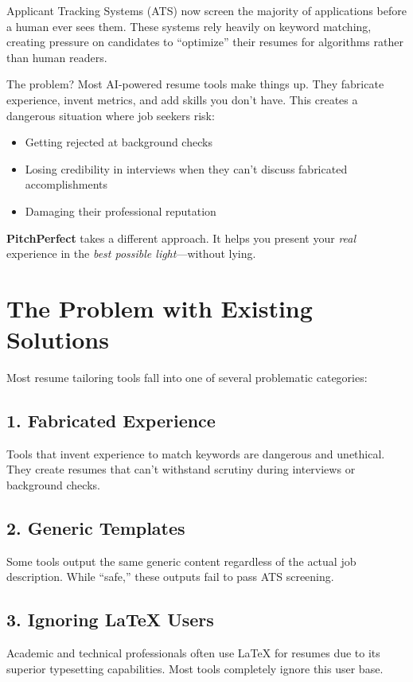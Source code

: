 \documentclass[12pt, a4paper]{article}
\begin{document}
Applicant Tracking Systems (ATS) now screen the majority of applications before a human ever sees them. These systems rely heavily on keyword matching, creating pressure on candidates to ``optimize'' their resumes for algorithms rather than human readers.

The problem? Most AI-powered resume tools make things up. They fabricate experience, invent metrics, and add skills you don't have. This creates a dangerous situation where job seekers risk:
\begin{itemize}
    \item Getting rejected at background checks
    \item Losing credibility in interviews when they can't discuss fabricated accomplishments
    \item Damaging their professional reputation
\end{itemize}

\textbf{PitchPerfect} takes a different approach. It helps you present your \textit{real} experience in the \textit{best possible light}---without lying.

\newpage

\section{The Problem with Existing Solutions}

Most resume tailoring tools fall into one of several problematic categories:

\subsection*{1. Fabricated Experience}
Tools that invent experience to match keywords are dangerous and unethical. They create resumes that can't withstand scrutiny during interviews or background checks.

\subsection*{2. Generic Templates}
Some tools output the same generic content regardless of the actual job description. While ``safe,'' these outputs fail to pass ATS screening.

\subsection*{3. Ignoring LaTeX Users}
Academic and technical professionals often use LaTeX for resumes due to its superior typesetting capabilities. Most tools completely ignore this user base.
\end{document}
